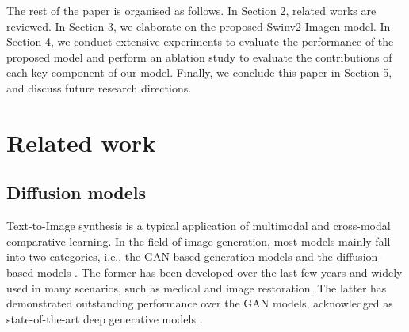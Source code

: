 \documentclass{article}
\begin{document}
The rest of the paper is organised as follows. In Section 2, related works are reviewed. In Section 3, we elaborate on the proposed Swinv2-Imagen model. In Section 4, we conduct extensive experiments to evaluate the performance of the proposed model and perform an ablation study to evaluate the contributions of each key component of our model. Finally, we conclude this paper in Section 5, and discuss future research directions.

\section{Related work}
\subsection{Diffusion models}
Text-to-Image synthesis is a typical application of multimodal and cross-modal comparative learning. In the field of image generation, most models mainly fall into two categories, i.e., the GAN-based generation models \cite{Zhu2019DMGANDM, Zhu2020CookGANCB, Zhang2019StackGANRI, Xia2021TediGANTD, Crowson2022VQGANCLIPOD, Cheng2020RiFeGANRF} and the diffusion-based models \cite{Ho2020DenoisingDP, Ho2022CascadedDM,Nichol2022GLIDETP, Rombach2022HighResolutionIS,Song2021DenoisingDI}. The former has been developed over the last few years and widely used in many scenarios, such as medical and image restoration. The latter has demonstrated outstanding performance over the GAN models, acknowledged as state-of-the-art deep generative models \cite{Saharia2022PhotorealisticTD, Dhariwal2021DiffusionMB, Yang2022DiffusionMA}.
\end{document}
